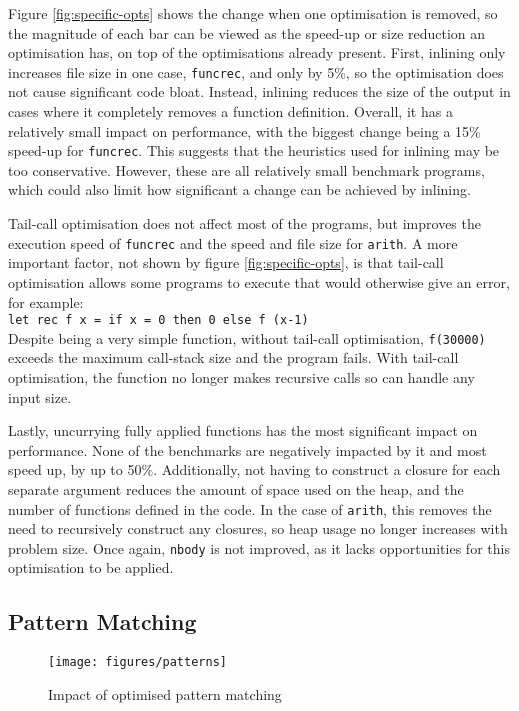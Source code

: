 Figure \ref{fig:specific-opts} shows the change when one optimisation is removed, so the magnitude of each bar can be viewed as the speed-up or size reduction an optimisation has, on top of the optimisations already present. First, inlining only increases file size in one case, \verb|funcrec|, and only by 5\%, so the optimisation does not cause significant code bloat. Instead, inlining reduces the size of the output in cases where it completely removes a function definition. Overall, it has a relatively small impact on performance, with the biggest change being a 15\% speed-up for \verb|funcrec|. This suggests that the heuristics used for inlining may be too conservative. However, these are all relatively small benchmark programs, which could also limit how significant a change can be achieved by inlining. %

Tail-call optimisation does not affect most of the programs, but improves the execution speed of \verb|funcrec| and the speed and file size for \verb|arith|. A more important factor, not shown by figure \ref{fig:specific-opts}, is that tail-call optimisation allows some programs to execute that would otherwise give an error, for example: \\
\verb|let rec f x = if x = 0 then 0 else f (x-1)| \\
Despite being a very simple function, without tail-call optimisation, \verb|f(30000)| exceeds the maximum call-stack size and the program fails. With tail-call optimisation, the function no longer makes recursive calls so can handle any input size.

Lastly, uncurrying fully applied functions has the most significant impact on performance. None of the benchmarks are negatively impacted by it and most speed up, by up to 50\%. Additionally, not having to construct a closure for each separate argument reduces the amount of space used on the heap, and the number of functions defined in the code. In the case of \verb|arith|, this removes the need to recursively construct any closures, so heap usage no longer increases with problem size. Once again, \verb|nbody| is not improved, as it lacks opportunities for this optimisation to be applied.

\subsection{Pattern Matching}
\begin{figure}[H]
\texttt{[image: figures/patterns]}
\vspace{-0.8cm}
\caption{Impact of optimised pattern matching}
 \label{fig:patterns} 
\end{figure}

